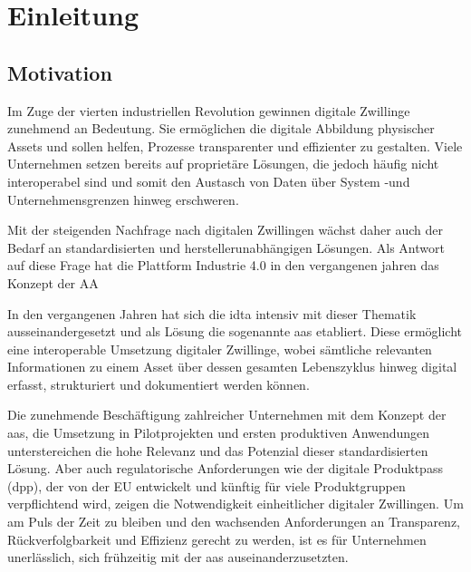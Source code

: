 \section{Einleitung}
\subsection{Motivation}
\label{sec:Motivation}
Im Zuge der vierten industriellen Revolution gewinnen digitale Zwillinge zunehmend an Bedeutung. 
Sie ermöglichen die digitale Abbildung physischer Assets und sollen helfen, Prozesse transparenter und effizienter zu gestalten.
Viele Unternehmen setzen bereits auf proprietäre Lösungen, die jedoch häufig nicht interoperabel sind und somit den Austasch von Daten über System -und Unternehmensgrenzen hinweg erschweren.

Mit der steigenden Nachfrage nach digitalen Zwillingen wächst daher auch der Bedarf an standardisierten und herstellerunabhängigen Lösungen.
Als Antwort auf diese Frage hat die Plattform Industrie 4.0 in den vergangenen jahren das Konzept der AA

In den vergangenen Jahren hat sich die \ac{idta} intensiv mit dieser Thematik ausseinandergesetzt und als Lösung die sogenannte \ac{aas} etabliert.
Diese ermöglicht eine interoperable Umsetzung digitaler Zwillinge, wobei sämtliche relevanten Informationen zu einem Asset über dessen gesamten Lebenszyklus hinweg digital erfasst, strukturiert und dokumentiert werden können. 

Die zunehmende Beschäftigung zahlreicher Unternehmen mit dem Konzept der \acs{aas}, die Umsetzung in Pilotprojekten und ersten produktiven Anwendungen unterstereichen die hohe Relevanz und das Potenzial dieser standardisierten Lösung.
Aber auch regulatorische Anforderungen wie der digitale Produktpass (\acs{dpp}), der von der EU entwickelt und künftig für viele Produktgruppen verpflichtend wird, zeigen die Notwendigkeit einheitlicher digitaler Zwillingen. 
Um am Puls der Zeit zu bleiben und den wachsenden Anforderungen an Transparenz, Rückverfolgbarkeit und Effizienz gerecht zu werden, ist es für Unternehmen unerlässlich, sich frühzeitig mit der \acs{aas} auseinanderzusetzten.

